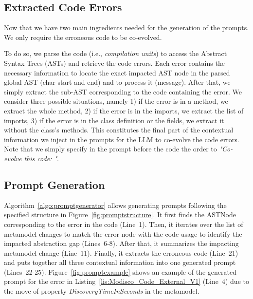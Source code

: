 \subsection{Extracted Code Errors}

Now that we have two main ingredients needed for the generation of the prompts. %
We only require the erroneous code to be co-evolved. 

To do so, we parse the code (i.e., \emph{compilation units}) to access the Abstract Syntax Trees (ASTs) and retrieve the code errors. %
Each error contains the necessary information to locate the exact impacted AST node in the parsed global AST (\ie char start and end) and to process it (\ie message). 
After that, we simply extract the sub-AST corresponding to the code containing the error. 
We consider three possible situations, namely 1) if the error is in a method, we extract the whole method, 2) if the error is in the imports, we extract the list of imports, 3) if the error is in the class definition or the fields, we extract it without the class's methods. This constitutes the final part of the contextual information we inject in the prompts for the LLM to co-evolve the code errors. Note that we simply specify in the prompt before the code the order to \emph{"Co-evolve this code: "}.




\subsection{Prompt Generation}
\label{promptgeneration}

Algorithm~\ref{algo:promptgenerator} allows generating prompts following the specified structure in Figure~\ref{fig:promptstructure}. It first finds the ASTNode corresponding to the error in the code (Line~1). Then, it iterates over the list of metamodel changes to match  the error node with the code usage to identify the impacted abstraction gap (Lines~6-8). After that, it summarizes the impacting metamodel change (Line~11). Finally, it extracts the erroneous code (Line~21) and puts together all three contextual information into one generated prompt (Lines~22-25). 
%
Figure~\ref{fig:promptexample} shows an example of the generated prompt for the error in Listing~\ref{lis:Modisco_Code_External_V1} (Line~4) due to the move of property \emph{DiscoveryTimeInSeconds} in the metamodel.  

